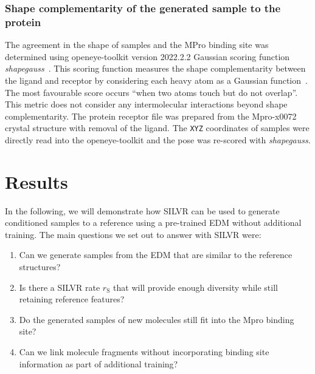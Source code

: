 \documentclass[journal=jacsat,manuscript=article]{achemso}
\begin{document}
\subsubsection{Shape complementarity of the generated sample to the protein}
The agreement in the shape of samples and the MPro binding site was determined using openeye-toolkit version 2022.2.2 Gaussian scoring function \textit{shapegauss}~\cite{openeyescientificsoftwareinc.oedocking,kelley2015posit}. This scoring function measures the shape complementarity between the ligand and receptor by considering each heavy atom as a Gaussian function~\cite{mcgann2003gaussian}. The most favourable score occurs “when two atoms touch but do not overlap”.  This metric does not consider any intermolecular interactions beyond shape complementarity. The protein receptor file was prepared from the Mpro-x0072 crystal structure with removal of the ligand. The \texttt{XYZ} coordinates of samples were directly read into the openeye-toolkit and the pose was re-scored with \textit{shapegauss}. 


\section{Results}
In the following, we will demonstrate how SILVR can be used to generate conditioned samples to a reference using a pre-trained EDM without additional training. The main questions we set out to answer with SILVR were:
\begin{enumerate}
    \item Can we generate samples from the EDM that are similar to the reference structures?
    \item Is there a SILVR rate $r_{\mathrm{S}}$ that will provide enough diversity while still retaining reference features?
    \item Do the generated samples of new molecules still fit into the Mpro binding site?
    \item Can we link molecule fragments without incorporating binding site information as part of additional training?
\end{enumerate}
\end{document}
